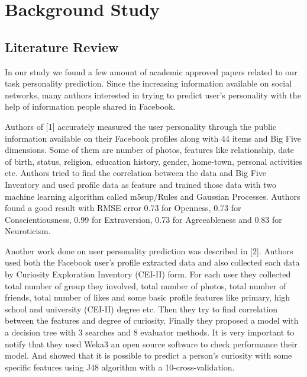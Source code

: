 \documentclass{standalone}
\begin{document}
\chapter{Background Study}
\section{Literature Review}
In our study we found a few amount of academic approved papers related to our task personality prediction. Since the increasing information available on social networks, many authors interested in trying to predict user’s personality with the help of information people shared in Facebook.

Authors of [1] accurately measured the user personality through the public information available on their Facebook profiles along with 44 items and Big Five dimensions. Some of them are number of photos, features like relationship, date of birth, status, religion, education history, gender, home-town, personal activities etc. Authors tried to find the correlation between the data and Big Five Inventory and used profile data as feature and trained those data with two machine learning algorithm called m5sup/Rules and Gaussian Processes. Authors found a good result with RMSE error 0.73 for Openness, 0.73 for Conscientiousness, 0.99 for Extraversion, 0.73 for Agreeableness and 0.83 for Neuroticism.

Another work done on user personality prediction was described in [2]. Authors used both the Facebook user’s profile extracted data and also collected each data by Curiosity Exploration Inventory (CEI-II) form. For each user they collected total number of group they involved, total number of photos, total number of friends, total number of likes and some basic profile features like primary, high school and university (CEI-II) degree etc. Then they try to find correlation between the features and degree of curiosity. Finally they proposed a model with a decision tree with 3 searches and 8 evaluator methods. It is very important to notify that they used Weka3 an open source software to check performance their model. And showed that it is possible to predict a person’s curiosity with some specific features using J48 algorithm with a 10-cross-validation.
\end{document}

